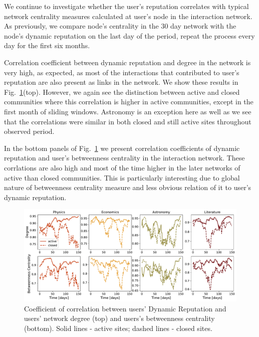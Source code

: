 We continue to investigate whether the user's reputation correlates with typical network centrality measures calculated at user's node in the interaction network. As previously, we compare node's centrality in the 30 day network with the node's dynamic reputation on the last day of the period, repeat the process every day for the first six months. 

Correlation coefficient between dynamic reputation and degree in the network is very high, as expected, as most of the interactions that contributed to user's reputation are also present as links in the network. We show these results in Fig.~\ref{fig:dyn_rep_centrality}(top). However, we again see the distinction between active and closed communities where this correlation is higher in active communities, except in the first month of sliding windows. Astronomy is an exception here as well as we see that the correlations were similar in both closed and still active sites throughout observed period. 


In the bottom panels of Fig.~\ref{fig:dyn_rep_centrality} we present correlation coefficients of dynamic reputation and user's betweenness centrality in the interaction network. These corrlations are also high and most of the time higher in the later networks of active than closed communities. This is particularly interesting due to global nature of betweenness centrality measure and less obvious relation of it to user's dynamic reputation.

\begin{figure}[h!]
	\centering
	\includegraphics[width=\linewidth]{figures/stackexchange/correlations.pdf}
	\caption{Coefficient of correlation between users' Dynamic Reputation and users' network degree (top) and users's betweenness centrality (bottom). Solid lines - active sites; dashed lines - closed sites.}
	\label{fig:dyn_rep_centrality}
\end{figure}





